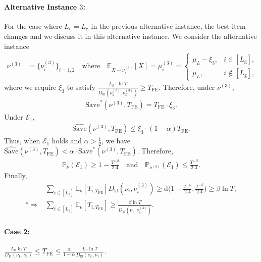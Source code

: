 \documentclass[twoside,11pt]{article}
\newcommand{\kl}{D_{\mathrm{kl}}}
\newcommand{\calE}{\mathcal{E}}
\newcommand{\calN}{\mathcal{N}}
\newcommand{\rmb}{\mathrm{b}}
\newcommand{\rmc}{\mathrm{c}}
\newcommand{\rmd}{\mathrm{d}}
\newcommand{\rmg}{\mathrm{g}}
\newcommand{\bbE}{\mathbb{E}}
\newcommand{\bbP}{\mathbb{P}}
\newcommand{\Tfe}{T_{\mathrm{FE}}}
\newcommand{\Saved}{\mathrm{Save}}
\begin{document}
\paragraph{Alternative Instance $3$:}
For the case where $L_{\rmc}=L_{\rmg}$ in the previous alternative instance, the best item changes and we discuss it in this alternative instance. We consider the alternative instance 
\begin{align}
\nu^{(3)} 
&= \big\{ \nu_i^{(3)} \big\}_{i=1,2} 
\quad\text{where}\quad \bbE_{X\sim \nu_i^{(3)}}[X]=
\mu_i^{(3)} =
\begin{cases}
\mu_L - \xi_3, & i \in[L_{\rmg}], \\
\mu_L, & i\notin [L_{\rmg}],
\end{cases}
\end{align}
where we require $\xi_3 $ to satisfy $ \frac{L_{\rmg}\cdot\ln T}{\kl(\nu_1^{(3)},\nu_L^{(3)})}\geq \Tfe$.
Therefore,
under $\nu^{(3)}$,
\begin{align}
    \Saved^*(\nu^{(3)},\Tfe) = \Tfe\cdot\xi_3.
\end{align}
Under $\calE_1$,
\begin{align}
    \widehat{\Saved}(\nu^{(3)},\Tfe) \leq \xi_3\cdot  (1-\alpha)\Tfe.
\end{align}
Thus, when $\calE_1$ holds and $\alpha> \frac{1}{2}$, we have $\widehat{\Saved}(\nu^{(3)},\Tfe) < \alpha\cdot \Saved^*(\nu^{(3)},\Tfe) $. Therefore, 
\begin{align}
    \bbP_{\nu}(\calE_1)\geq 1- \frac{T^{-\beta}}{2.4}
    \quad
    \mbox{and}
    \quad
    \bbP_{\nu^{(3)}}(\calE_1)\leq   \frac{T^{-\beta}}{2.4}.
\end{align}
Finally,
\begin{align}
    &\sum_{i\in[L_{\rmg}]}\bbE_{\nu}[T_{i,\Tfe}] \kl(\nu_i,\nu_i^{(3)}) \geq \rmd \bigg(1-\frac{T^{-\beta}}{2.4}, \frac{T^{-\beta}}{2.4}\bigg)
    \geq \beta\ln T,
    \\*
    \Rightarrow&
     \sum_{i\in[L_{\rmg}]}\bbE_{\nu}[T_{i,\Tfe}] \geq \frac{\beta\ln T}{\kl(\nu_1,\nu_1^{(3)})}.
\end{align}

\paragraph{\textbf{\underline{Case 2}}:}  $ \frac{L_{\rmb}\ln T}{\kl(\nu_L,\nu_1)} \leq \Tfe\leq \frac{\alpha}{1-\alpha}\frac{L_{\rmb}\ln T}{\kl(\nu_L,\nu_1)}$.
\end{document}
